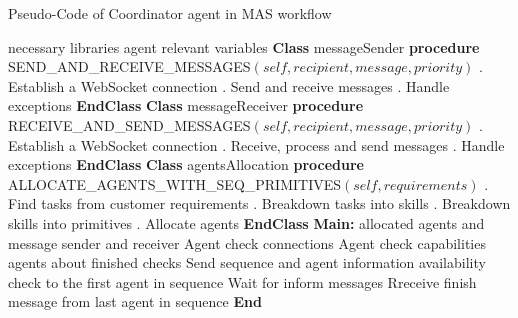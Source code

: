    
\begin{algorithm}
\caption{Pseudo-Code of Coordinator agent in MAS workflow}
\label{alg:CDAPseudoCode}
\begin{algorithmic}
 necessary libraries
 agent relevant variables
\State \textbf{Class} messageSender
    \State \textbf{\qquad procedure} {SEND\_AND\_RECEIVE\_MESSAGES$(self, recipient, message, priority)$}
    \State \qquad {}. Establish a WebSocket connection
    \State \qquad {}. Send and receive messages
    \State \qquad {}. Handle exceptions
\State \textbf{EndClass}
\State \textbf{Class} messageReceiver
    \State \textbf{\qquad procedure} {RECEIVE\_AND\_SEND\_MESSAGES$(self, recipient, message, priority)$}
    \State \qquad {}. Establish a WebSocket connection
    \State \qquad {}. Receive, process and send messages
    \State \qquad {}. Handle exceptions
\State \textbf{EndClass}
\State \textbf{Class} agentsAllocation
    \State \textbf{\qquad procedure} {ALLOCATE\_AGENTS\_WITH\_SEQ\_PRIMITIVES$(self, requirements)$}
    \State \qquad {}. Find tasks from customer requirements
    \State \qquad {}. Breakdown tasks into skills
    \State \qquad {}. Breakdown skills into primitives
    \State \qquad {}. Allocate agents
\State \textbf{EndClass}
\State \textbf{Main:}
 allocated agents and message sender and receiver
\State {\qquad}Agent check connections
\State {\qquad}Agent check capabilities
 agents about finished checks
\State {\qquad}Send sequence and agent information
 availability check to the first agent in sequence
\State {\qquad}Wait for inform messages
\State \qquad Rreceive finish message from last agent in sequence 
\State \textbf{\qquad End} 
\end{algorithmic}
\end{algorithm}


